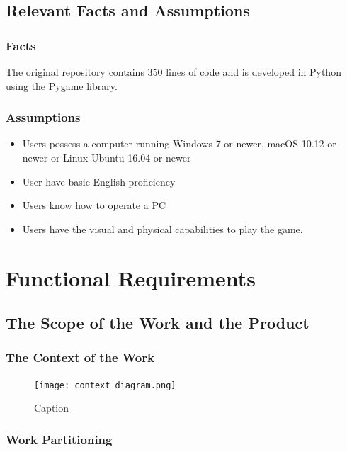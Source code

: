 \documentclass[12pt]{article}
\begin{document}
\subsection{Relevant Facts and Assumptions}
\subsubsection{Facts}
The original repository contains 350 lines of code and is developed in Python using the Pygame library. 
\subsubsection{Assumptions}
\begin{itemize}
    \item Users possess a computer running Windows 7 or newer, macOS 10.12 or newer or Linux Ubuntu 16.04 or newer
   \item User have basic English proficiency 
    \item Users know how to operate a PC
    \item Users have the visual and physical capabilities to play the game.
\end{itemize}

\section{Functional Requirements}

\subsection{The Scope of the Work and the Product}

\subsubsection{The Context of the Work}
\begin{figure}[!ht]
    \centering
    \texttt{[image: context\_diagram.png]}
    \caption{Caption}
\end{figure}

\subsubsection{Work Partitioning}
\end{document}
